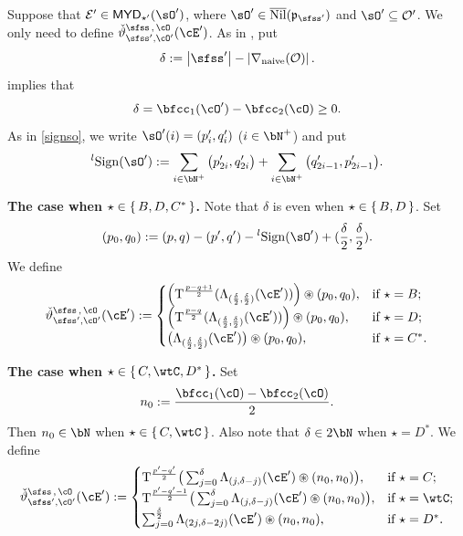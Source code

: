 \documentclass[11pt,a4paper]{amsart}
\def\MYD{{\mathsf{MYD}}}
\def\abs#1{\left|{#1}\right|}
\newcommand{\CE}{{\mathcal {E}}}
\newcommand{\CO}{{\mathcal {O}}}
\newcommand{\p}{\mathfrak p}
\def\DD{\nabla}
\numberwithin{equation}{section}
\theoremstyle{remark}
\def\subset{\subseteq}
\def\Nil{\overline{\mathrm{Nil}}}
\def\lsign{{}^l\mathrm{Sign}}
\def\maltese{\mathrm{T}}
\def\MYD{{\mathsf{MYD}}}
\begin{document}
 Suppose that $\CE'\in\MYD_{\star '}(\sO')$, where $\sO'\in \Nil(\p_{\sfss'})$ and $\sO'\subset \CO'$.
 We only need to define $\dliftso (\cE')$.
 As in , put
\[
 \delta:=  \abs{\sfss'}-\abs{\DD_\mathrm{naive}(\CO)}.
\]
  implies that
\[
\delta= \bfcc_{1}(\cO')-\bfcc_{2}(\cO)\geq 0.
\]
 As in \eqref{signso}, we write $\sO'(i)=( p'_i, q'_i)$ ($i\in \bN^+$) and put
\[
  \lsign(\sO') :=
    \sum_{i\in \bN^{+}} \big(p'_{2i},q'_{2i} \big)
      + \sum_{i\in \bN^{+}} \big(q'_{2i-1},p'_{2i-1} \big).
\]

{\bf The case when  $\star \in \set{B,D, C^{*}}$.} Note that $\delta$ is even when $\star\in \set{B,D}$. Set
\[
(p_{0}, q_{0})  := (p,q) -(p',q')-\lsign(\sO') +
(\frac{\delta}{2},\frac{\delta}{2}).
\]
We define
\begin{equation}\label{eq:LCD}
  \dliftso(\cEp) :=
  \begin{cases}
  \left(\maltese^{\frac{p-q+1}{2}}(\Lambda_{(\frac{\delta}{2},\frac{\delta}{2})}( \cEp))\right)\circledast (p_{0},q_{0}), &
    \text{if } \star=B; \\
    \left(\maltese^{\frac{p-q}{2}}(\Lambda_{(\frac{\delta}{2},\frac{\delta}{2})}( \cEp))\right)\circledast (p_{0},q_{0}), &
    \text{if }  \star=D; \\
    \big(\Lambda_{(\frac{\delta}{2},\frac{\delta}{2})}( \cEp)\big)\circledast (p_{0},q_{0}), &
    \text{if } \star=C^{*}. \\
  \end{cases}
\end{equation}



{\bf The case when  $\star \in \set{C,\wtC,D^{*}}$.}
Set \[
n_{0} := \frac{\bfcc_{1}(\cO)-\bfcc_{2}(\cO)}{2}.
\]
Then $n_0\in \bN$ when $\star\in \set{C,\wtC}$. Also note that $\delta\in 2\bN$ when $\star=D^*$. We define
\begin{equation}\label{eq:LDC}
  \dliftso(\cEp) :=
  \begin{cases}
    \maltese^{\frac{p'-q'}{2}}\big(\sum_{j=0}^{\delta} \Lambda_{(j,\delta-j)}( \cEp)\circledast (n_{0},n_{0})\big), & \text{if
    } \star = C;\\
    \maltese^{\frac{p'-q'-1}{2}}\big(\sum_{j=0}^{\delta} \Lambda_{(j,\delta-j)}( \cEp)\circledast (n_{0},n_{0})\big), & \text{if
    } \star = \wtC;\\
    \sum_{j=0}^{\frac{\delta}{2}} \Lambda_{(2j,\delta-2j)}( \cEp)\circledast (n_{0},n_{0}),\quad & \text{if
    $\star = D^{*}$.}
  \end{cases}
\end{equation}
\end{document}

